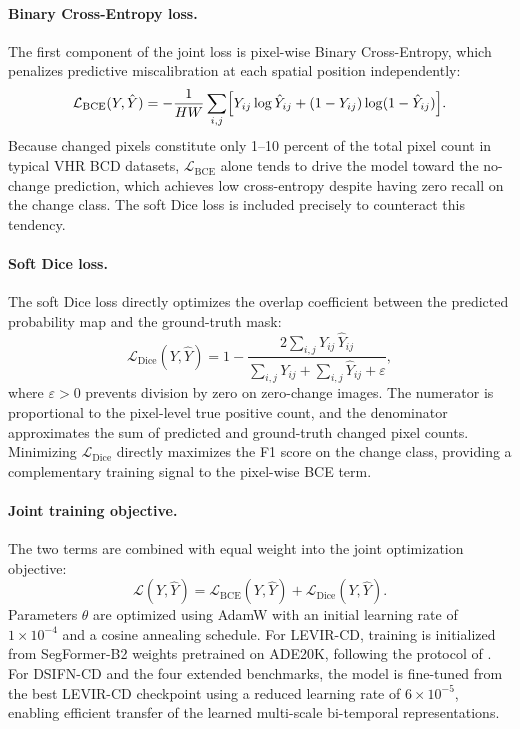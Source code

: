 \paragraph{Binary Cross-Entropy loss.}
The first component of the joint loss is pixel-wise Binary Cross-Entropy,
which penalizes predictive miscalibration at each spatial position
independently:
\begin{equation}
\mathcal{L}_{\mathrm{BCE}}(Y, \hat{Y})
    = -\frac{1}{HW} \sum_{i,j}
      \Bigl[
        Y_{ij} \log \hat{Y}_{ij}
        + (1 - Y_{ij}) \log(1 - \hat{Y}_{ij})
      \Bigr].
\label{eq:bce_loss}
\end{equation}
Because changed pixels constitute only 1--10 percent of the total pixel count
in typical VHR BCD datasets, $\mathcal{L}_{\mathrm{BCE}}$ alone tends to
drive the model toward the no-change prediction, which achieves low cross-entropy
despite having zero recall on the change class. The soft Dice loss is included
precisely to counteract this tendency.

\paragraph{Soft Dice loss.}
The soft Dice loss directly optimizes the overlap coefficient between the
predicted probability map and the ground-truth mask:
\begin{equation}
\mathcal{L}_{\mathrm{Dice}}(Y, \hat{Y})
    = 1 - \frac{2\displaystyle\sum_{i,j} Y_{ij}\,\hat{Y}_{ij}}
               {\displaystyle\sum_{i,j} Y_{ij}
                + \displaystyle\sum_{i,j} \hat{Y}_{ij} + \varepsilon},
\label{eq:dice_loss}
\end{equation}
where $\varepsilon > 0$ prevents division by zero on zero-change images.
The numerator is proportional to the pixel-level true positive count, and
the denominator approximates the sum of predicted and ground-truth changed
pixel counts. Minimizing $\mathcal{L}_{\mathrm{Dice}}$ directly maximizes
the F1 score on the change class, providing a complementary training signal
to the pixel-wise BCE term.

\paragraph{Joint training objective.}
The two terms are combined with equal weight into the joint optimization
objective:
\begin{equation}
\mathcal{L}(Y, \hat{Y})
    = \mathcal{L}_{\mathrm{BCE}}(Y, \hat{Y})
    + \mathcal{L}_{\mathrm{Dice}}(Y, \hat{Y}).
\label{eq:joint_loss}
\end{equation}
Parameters $\theta$ are optimized using AdamW with an initial learning rate of
$1 \times 10^{-4}$ and a cosine annealing schedule. For LEVIR-CD, training
is initialized from SegFormer-B2 weights pretrained on ADE20K, following the
protocol of \cite{Bandara2022ChangeFormer}. For DSIFN-CD and the four extended
benchmarks, the model is fine-tuned from the best LEVIR-CD checkpoint using a
reduced learning rate of $6 \times 10^{-5}$, enabling efficient transfer of
the learned multi-scale bi-temporal representations.


